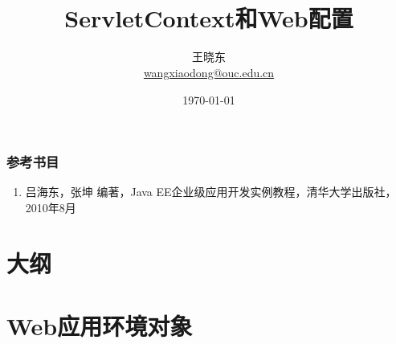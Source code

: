 
\title[KevinW@OUC]{\\  
ServletContext和Web配置}
\author[王晓东]{王晓东\\
  \href{mailto:wangxiaodong@ouc.edu.cn}{\footnotesize wangxiaodong@ouc.edu.cn}}
\date{\today}


 \frame{\titlepage}

\begin{frame}
\frametitle{参考书目}
\begin{enumerate}
\item 吕海东，张坤 编著，Java EE企业级应用开发实例教程，清华大学出版社，2010年8月
\end{enumerate}  
\end{frame}


\section*{大纲}

\section{Web应用环境对象}

